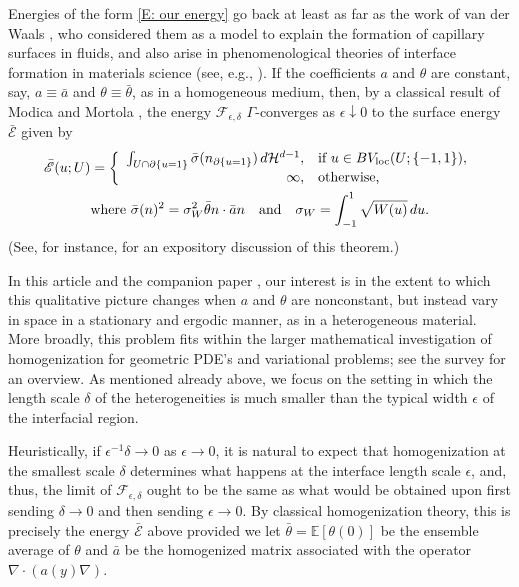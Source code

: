 \documentclass[10pt,a4paper]{amsart}
\begin{document}
Energies of the form \eqref{E: our energy} go back at least as far as the work of van der Waals \cite{van-der-waals,rowlinson_translation}, who considered them as a model to explain the formation of capillary surfaces in fluids, and also arise in phenomenological theories of interface formation in materials science (see, e.g., \cite[Chapter 8]{glicksman2010principles}).  If the coefficients $a$ and $\theta$ are constant, say, $a \equiv \bar{a}$ and $\theta \equiv \bar{\theta}$, as in a homogeneous medium, then, by a classical result of Modica and Mortola \cite{modica_mortola, modica}, the energy $\mathscr{F}_{\epsilon,\delta}$ $\Gamma$-converges as $\epsilon \downarrow 0$ to the surface energy $\bar{ \mathscr{E} }$ given by
	\begin{align}
		\bar{ \mathscr{ E } }(u ; U ) &= \left\{ \begin{array}{r l}
			\int_{ U \cap \partial \{ u = 1 \} } \bar{\sigma} ( n_{\partial \{ u = 1 \} } ) \, d \mathcal{H}^{d-1}, & \text{if} \, \, u \in BV_{\text{loc}}(U; \{-1,1\}),  \\
			 \infty, & \text{otherwise,}
		\end{array} \right. \label{E: homogenized energy} \\ 
		&\text{where} \, \, \bar{\sigma}(n)^{2} = \sigma_{W}^{2} \bar{\theta}  n \cdot \bar{a} n  \quad \text{and} \quad \sigma_{W} = \int_{-1}^{1} \sqrt{ W(u) } \, du. \nonumber
	\end{align}
(See, for instance, \cite{AlbertiLectureNotes} for an expository discussion of this theorem.)

In this article and the companion paper \cite{part1}, our interest is in the extent to which this qualitative picture changes when $a$ and $\theta$ are nonconstant, but instead vary in space in a stationary and ergodic manner, as in a heterogeneous material. More broadly, this problem fits within the larger mathematical investigation of homogenization for geometric PDE's and variational problems; see the survey \cite{caffarelli} for an overview.  As mentioned already above, we focus on the setting in which the length scale $\delta$ of the heterogeneities is much smaller than the typical width $\epsilon$ of the interfacial region.

Heuristically, if $\epsilon^{-1} \delta \to 0$ as $\epsilon \to 0$, it is natural to expect that homogenization at the smallest scale $\delta$ determines what happens at the interface length scale $\epsilon$, and, thus, the limit of $\mathscr{F}_{\epsilon,\delta}$ ought to be the same as what would be obtained upon first sending $\delta \to 0$ and then sending $\epsilon \to 0$.  By classical homogenization theory, this is precisely the energy $\bar{\mathscr{E}}$ above provided we let $\bar{\theta} = \mathbb{E} [ \theta(0) ]$ be the ensemble average of $\theta$ and $ \bar{a} $ be the homogenized matrix associated with the operator $\nabla \cdot ( a(y) \nabla )$.
\end{document}
